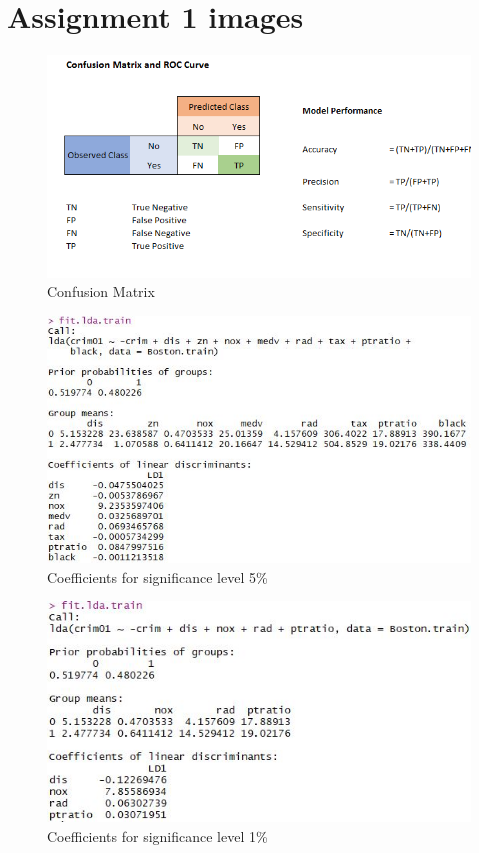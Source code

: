 \section{Assignment 1 images}

\label{app:confusion_matrix}
\begin{figure}[H]
\centering
\includegraphics[scale=0.55]{Graphics/Assignment1/ConfusionMatrix.png}
\caption{Confusion Matrix}
\label{fig:confusion_Matrix}
\end{figure}

\subtitle{LDA coefficients results}
\begin{figure}[H]
\centering
\includegraphics[scale=0.55]{Graphics/Assignment1/LDACoefficients_005.JPG}
\caption{Coefficients for significance level 5\%}
\label{fig:coefficients_method_005}
\end{figure}

\begin{figure}[H]
\centering
\includegraphics[scale=0.55]{Graphics/Assignment1/LDACoefficients_001.JPG}
\caption{Coefficients for significance level 1\%}
\label{fig:coefficients_method_001}
\end{figure}

